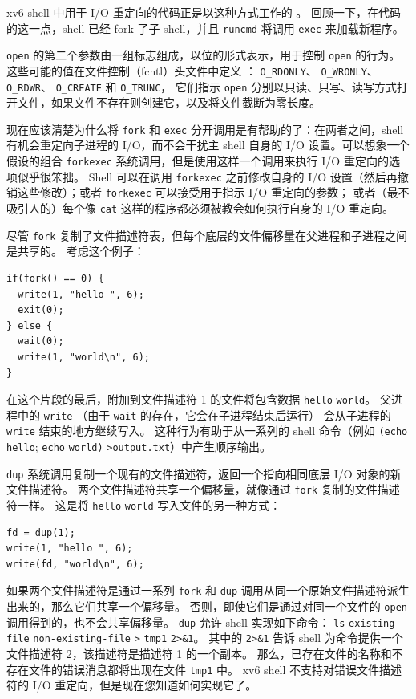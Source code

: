 xv6 shell 中用于 I/O 重定向的代码正是以这种方式工作的
。
回顾一下，在代码的这一点，shell 已经 fork 了子 shell，并且
\lstinline{runcmd}
将调用
\lstinline{exec}
来加载新程序。

\lstinline{open}
的第二个参数由一组标志组成，以位的形式表示，用于控制 \lstinline{open}
的行为。这些可能的值在文件控制（fcntl）头文件中定义
：
\lstinline{O_RDONLY}、
\lstinline{O_WRONLY}、
\lstinline{O_RDWR}、
\lstinline{O_CREATE} 和
\lstinline{O_TRUNC}，
它们指示 \lstinline{open} 分别以只读、只写、读写方式打开文件，如果文件不存在则创建它，以及将文件截断为零长度。

现在应该清楚为什么将
\lstinline{fork}
和 
\lstinline{exec} 
分开调用是有帮助的了：在两者之间，shell 有机会重定向子进程的 I/O，而不会干扰主 shell 自身的 I/O 设置。可以想象一个假设的组合
\lstinline{forkexec} 系统调用，但是使用这样一个调用来执行 I/O 重定向的选项似乎很笨拙。
Shell 可以在调用 \lstinline{forkexec} 之前修改自身的 I/O 设置（然后再撤销这些修改）；或者
\lstinline{forkexec} 可以接受用于指示 I/O 重定向的参数；
或者（最不吸引人的）每个像 \lstinline{cat} 这样的程序都必须被教会如何执行自身的 I/O 重定向。

尽管
\lstinline{fork}
复制了文件描述符表，但每个底层的文件偏移量在父进程和子进程之间是共享的。
考虑这个例子：
\begin{lstlisting}[]
if(fork() == 0) {
  write(1, "hello ", 6);
  exit(0);
} else {
  wait(0);
  write(1, "world\n", 6);
}
\end{lstlisting}
在这个片段的最后，附加到文件描述符 1 的文件将包含数据
\lstinline{hello}
\lstinline{world}。
父进程中的
\lstinline{write}
（由于
\lstinline{wait}
的存在，它会在子进程结束后运行）
会从子进程的
\lstinline{write}
结束的地方继续写入。
这种行为有助于从一系列的 shell 命令（例如
\lstinline{(echo}
\lstinline{hello};
\lstinline{echo}
\lstinline{world)}
\lstinline{>output.txt}）中产生顺序输出。

\lstinline{dup}
系统调用复制一个现有的文件描述符，返回一个指向相同底层 I/O 对象的新文件描述符。
两个文件描述符共享一个偏移量，就像通过
\lstinline{fork}
复制的文件描述符一样。
这是将
\lstinline{hello}
\lstinline{world}
写入文件的另一种方式：
\begin{lstlisting}[]
fd = dup(1);
write(1, "hello ", 6);
write(fd, "world\n", 6);
\end{lstlisting}

如果两个文件描述符是通过一系列
\lstinline{fork}
和
\lstinline{dup}
调用从同一个原始文件描述符派生出来的，那么它们共享一个偏移量。
否则，即使它们是通过对同一个文件的
\lstinline{open}
调用得到的，也不会共享偏移量。
\lstinline{dup} 
允许 shell 实现如下命令：
\lstinline{ls}
\lstinline{existing-file}
\lstinline{non-existing-file}
\lstinline{>}
\lstinline{tmp1}
\lstinline{2>&1}。
其中的
\lstinline{2>&1}
告诉 shell 为命令提供一个文件描述符 2，该描述符是描述符 1 的一个副本。
那么，已存在文件的名称和不存在文件的错误消息都将出现在文件
\lstinline{tmp1}
中。
xv6 shell 不支持对错误文件描述符的 I/O 重定向，但是现在您知道如何实现它了。


